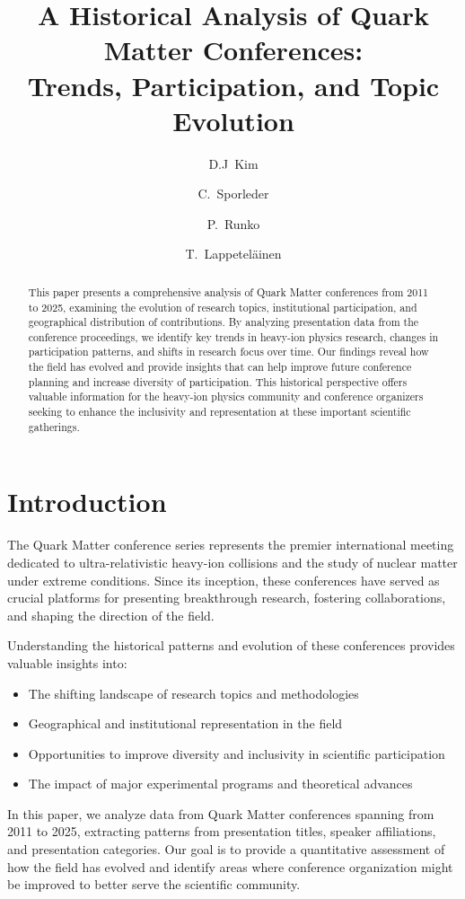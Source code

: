 \documentclass[a4paper,11pt]{article}
\title{A Historical Analysis of Quark Matter Conferences: \\
Trends, Participation, and Topic Evolution}
\author[1]{D.J~Kim}
\author[1]{C.~Sporleder}
\author[1]{P.~Runko}
\author[1]{T.~Lappeteläinen}
\affil[1]{Department of Physics, University of jyväskylä, Finland}
\begin{document}
\maketitle

\begin{abstract}
This paper presents a comprehensive analysis of Quark Matter conferences from 2011 to 2025, examining the evolution of research topics, institutional participation, and geographical distribution of contributions. By analyzing presentation data from the conference proceedings, we identify key trends in heavy-ion physics research, changes in participation patterns, and shifts in research focus over time. Our findings reveal how the field has evolved and provide insights that can help improve future conference planning and increase diversity of participation. This historical perspective offers valuable information for the heavy-ion physics community and conference organizers seeking to enhance the inclusivity and representation at these important scientific gatherings.
\end{abstract}

\section{Introduction}

The Quark Matter conference series represents the premier international meeting dedicated to ultra-relativistic heavy-ion collisions and the study of nuclear matter under extreme conditions. Since its inception, these conferences have served as crucial platforms for presenting breakthrough research, fostering collaborations, and shaping the direction of the field. 

Understanding the historical patterns and evolution of these conferences provides valuable insights into:
\begin{itemize}
    \item The shifting landscape of research topics and methodologies
    \item Geographical and institutional representation in the field
    \item Opportunities to improve diversity and inclusivity in scientific participation
    \item The impact of major experimental programs and theoretical advances
\end{itemize}

In this paper, we analyze data from Quark Matter conferences spanning from 2011 to 2025, extracting patterns from presentation titles, speaker affiliations, and presentation categories. Our goal is to provide a quantitative assessment of how the field has evolved and identify areas where conference organization might be improved to better serve the scientific community.
\end{document}
